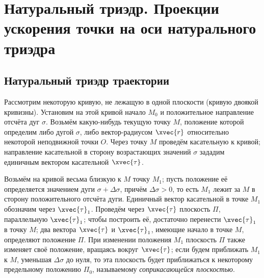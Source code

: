 \section{Натуральный триэдр. Проекции ускорения точки на оси натурального
триэдра}

\subsection{Натуральный триэдр траектории}

\begin{figure}[H]
  \centering

  \caption{}
  \label{fig:natural_trihedron}
\end{figure}

Рассмотрим некоторую кривую, не лежащую в одной плоскости (кривую двоякой
кривизны). Установим на этой кривой начало $M_0$ и положительное направление
отсчёта дуг $\sigma$. Возьмём какую-нибудь текущую точку $M$, положение
которой определим либо дугой $\sigma$, либо вектор-радиусом $\xvec{r}$
относительно некоторой неподвижной точки $O$. Через точку $M$ проведём
касательную к кривой; направление касательной в сторону возрастающих значений
$\sigma$ зададим единичным вектором касательной $\xvec{\tau}$.

Возьмём на кривой весьма близкую к $M$ точку $M_1$; пусть положение её
определяется значением дуги $\sigma + \Delta \sigma$, причём
$\Delta \sigma > 0$, то есть $M_1$ лежит за $M$ в сторону положительного
отсчёта дуги. Единичный вектор касательной в точке $M_1$ обозначим через
$\xvec{\tau}_1$. Проведём через $\xvec{\tau}$ плоскость $\Pi$, параллельную
$\xvec{\tau}_1$; чтобы построить её, достаточно перенести $\xvec{\tau}_1$ в
точку $M$; два вектора $\xvec{\tau}$ и $\xvec{\tau}_1$, имеющие начало в точке
$M$, определяют положение $\Pi$. При изменении положения $M_1$ плоскость $\Pi$
также изменяет своё положение, вращаясь вокруг $\xvec{\tau}$; если будем
приближать $M_1$ к $M$, уменьшая $\Delta \sigma$ до нуля, то эта плоскость
будет приближаться к некоторому предельному положению $\Pi_0$, называемому
\textit{соприкасающейся плоскостью}.

